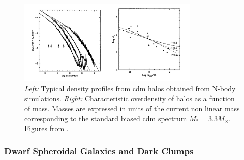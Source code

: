 \documentclass[main.tex]{subfiles}
\begin{document}
\begin{figure}
\centering
 \includegraphics[width=0.77\textwidth]{Pictures/DMhalos.pdf}
  \caption{\textit{Left:} Typical density profiles from \gls{cdm} halos obtained from N-body simulations. \textit{Right:} Characteristic overdensity of halos as a function of mass. Masses are expressed in units of the current non linear mass corresponding to the standard biased \gls{cdm} spectrum $M_{*}=3.3 M_{\odot}$. Figures from \cite{navarro_1996}.}
    \label{fig:DMhalos}
\end{figure}

\subsubsection{Dwarf Spheroidal Galaxies and Dark Clumps}
\end{document}
